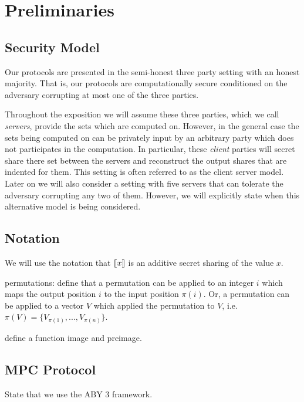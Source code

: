 \section{Preliminaries} \label{sec:prelim}


\subsection{Security Model}

Our protocols are presented in the semi-honest three party setting with an honest majority. That is, our protocols are computationally secure conditioned on the adversary corrupting at most one of the three parties. 



Throughout the exposition we will assume these three parties, which we call \emph{servers}, provide the sets which are computed on. However, in the general case the sets being computed on can be privately input by an arbitrary party which does not participates in the computation. In particular, these \emph{client} parties will secret share there set between the servers and reconstruct the output shares that are indented for them. This setting is often referred to as the client server model\cite{aby3, secureML}. Later on we will also consider a setting with five servers that can tolerate the adversary corrupting any two of them. However, we will explicitly state when this alternative model is being considered.



\subsection{Notation}

We will use the notation that $\llbracket x\rrbracket$ is an additive secret sharing of the value $x$.

permutations: define that a permutation can be applied to an integer $i$ which maps the output position $i$ to the input position $\pi(i)$. Or, a permutation can be applied to a vector $V$ which applied the permutation to $V$, i.e. $\pi(V)=\{V_{\pi(1)}, ..., V_{\pi(n)}\}$. 


define a function image and preimage.


\subsection{MPC Protocol}

State that we use the ABY 3 framework. 

